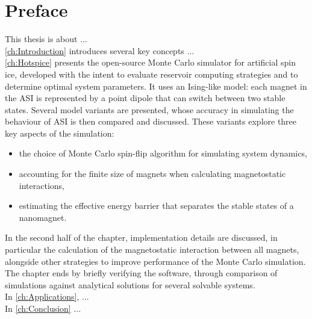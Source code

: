 \chapter*{Preface}

This thesis is about ... \\

\cref{ch:Introduction} introduces several key concepts ... \\

\cref{ch:Hotspice} presents the open-source \hotspice Monte Carlo simulator for artificial spin ice, developed with the intent to evaluate reservoir computing strategies and to determine optimal system parameters.
It uses an Ising-like model: each magnet in the ASI is represented by a point dipole that can switch between two stable states.
Several model variants are presented, whose accuracy in simulating the behaviour of ASI is then compared and discussed.
These variants explore three key aspects of the simulation:
\begin{itemize}[noitemsep,nolistsep] %
	\item the choice of Monte Carlo spin-flip algorithm for simulating system dynamics,
	\item accounting for the finite size of magnets when calculating magnetostatic interactions,
	\item estimating the effective energy barrier that separates the stable states of a nanomagnet.
\end{itemize}
In the second half of the chapter, implementation details are discussed, in particular the calculation of the magnetostatic interaction between all magnets, alongside other strategies to improve performance of the Monte Carlo simulation.
The chapter ends by briefly verifying the software, through comparison of simulations against analytical solutions for several solvable systems. \\

In \cref{ch:Applications}, ... \\

In \cref{ch:Conclusion} ...
